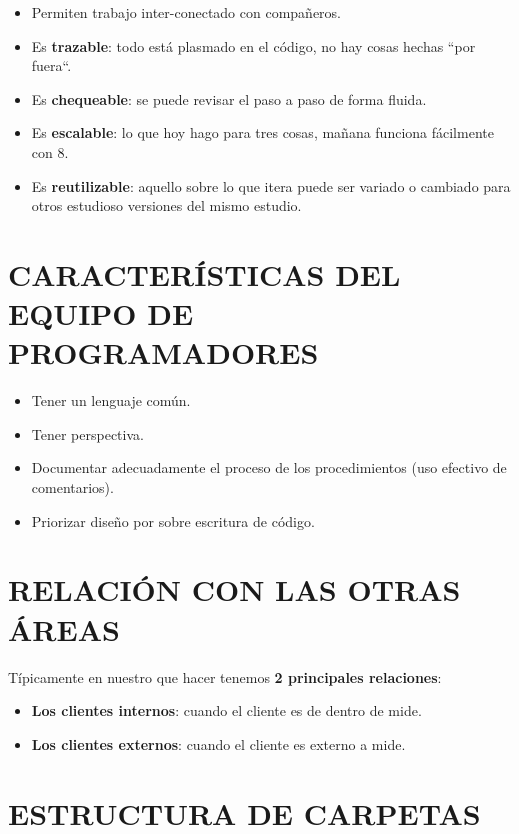 \documentclass[
  letterpaper,
  DIV=11,
  numbers=noendperiod]{scrreprt}
\begin{document}
\begin{itemize}
\item
  Permiten trabajo inter-conectado con compañeros.
\item
  Es \textbf{trazable}: todo está plasmado en el código, no hay cosas
  hechas ``por fuera``.
\item
  Es \textbf{chequeable}: se puede revisar el paso a paso de forma
  fluida.
\item
  Es \textbf{escalable}: lo que hoy hago para tres cosas, mañana
  funciona fácilmente con 8.
\item
  Es \textbf{reutilizable}: aquello sobre lo que itera puede ser variado
  o cambiado para otros estudioso versiones del mismo estudio.
\end{itemize}

\section{CARACTERÍSTICAS DEL EQUIPO DE
PROGRAMADORES}\label{caracteruxedsticas-del-equipo-de-programadores}

\begin{itemize}
\item
  Tener un lenguaje común.
\item
  Tener perspectiva.
\item
  Documentar adecuadamente el proceso de los procedimientos (uso
  efectivo de comentarios).
\item
  Priorizar diseño por sobre escritura de código.
\end{itemize}

\section{RELACIÓN CON LAS OTRAS
ÁREAS}\label{relaciuxf3n-con-las-otras-uxe1reas}

Típicamente en nuestro que hacer tenemos \textbf{2 principales
relaciones}:

\begin{itemize}
\item
  \textbf{Los clientes internos}: cuando el cliente es de dentro de
  mide.
\item
  \textbf{Los clientes externos}: cuando el cliente es externo a mide.
\end{itemize}

\section{ESTRUCTURA DE CARPETAS}\label{estructura-de-carpetas}
\end{document}
